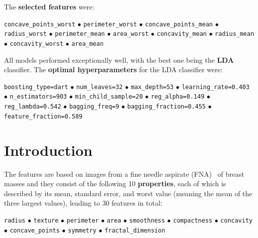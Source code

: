 \documentclass[12pt]{article}
\begin{document}
The \textbf{selected features} were:
\begin{center}
    \texttt{concave\_points\_worst}
    $\bullet$ 
    \texttt{perimeter\_worst}
    $\bullet$ 
    \texttt{concave\_points\_mean}
    $\bullet$ 
    \texttt{radius\_worst}
    $\bullet$ 
    \texttt{perimeter\_mean}
    $\bullet$ 
    \texttt{area\_worst}
    $\bullet$ 
    \texttt{concavity\_mean}
    $\bullet$ 
    \texttt{radius\_mean}
    $\bullet$ 
    \texttt{concavity\_worst}
    $\bullet$ 
    \texttt{area\_mean}
\end{center}

All models performed exceptionally well, with the best one being the
\textbf{LDA} classifier. The \textbf{optimal hyperparameters} for the LDA
classifier were:
\begin{center}
    \texttt{boosting\_type=dart}
    $\bullet$ 
    \texttt{num\_leaves=32}
    $\bullet$ 
    \texttt{max\_depth=53}
    $\bullet$ 
    \texttt{learning\_rate=0.403}
    $\bullet$ 
    \texttt{n\_estimators=903}
    $\bullet$ 
    \texttt{min\_child\_sample=20}
    $\bullet$ 
    \texttt{reg\_alpha=0.149}
    $\bullet$ 
    \texttt{reg\_lambda=0.542}
    $\bullet$ 
    \texttt{bagging\_freq=9}
    $\bullet$ 
    \texttt{bagging\_fraction=0.455}
    $\bullet$ 
    \texttt{feature\_fraction=0.589}
\end{center}



\section{Introduction}

The features are based on images from a fine needle aspirate (FNA)~\cite{Yu2012}
of breast masses and they consist of the following 10 \textbf{properties}, each
of which is described by its mean, standard error, and worst value (meaning the
mean of the three largest values), leading to 30 features in total:
\begin{center}
    \texttt{radius}
    $\bullet$ 
    \texttt{texture}
    $\bullet$ 
    \texttt{perimeter}
    $\bullet$ 
    \texttt{area}
    $\bullet$ 
    \texttt{smoothness}
    $\bullet$ 
    \texttt{compactness}
    $\bullet$ 
    \texttt{concavity}
    $\bullet$ 
    \texttt{concave\_points}
    $\bullet$ 
    \texttt{symmetry}
    $\bullet$ 
    \texttt{fractal\_dimension}    
\end{center}
\end{document}
